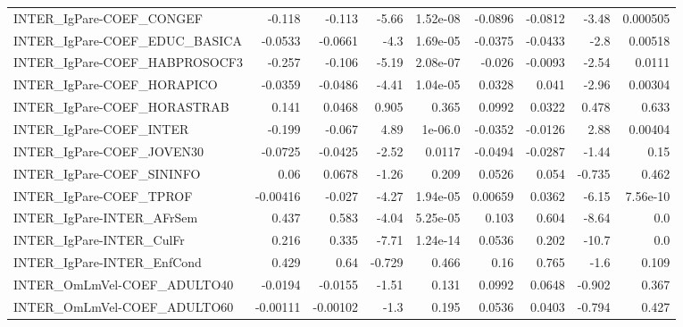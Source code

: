 \begin{tabular}{lrrrrrrrr}
INTER\_IgPare-COEF\_CONGEF              &      -0.118 &       -0.113 &    -5.66 & 1.52e-08 &    -0.0896 &     -0.0812 &        -3.48 &      0.000505 \\
INTER\_IgPare-COEF\_EDUC\_BASICA         &     -0.0533 &      -0.0661 &     -4.3 & 1.69e-05 &    -0.0375 &     -0.0433 &         -2.8 &       0.00518 \\
INTER\_IgPare-COEF\_HABPROSOCF3         &      -0.257 &       -0.106 &    -5.19 & 2.08e-07 &     -0.026 &     -0.0093 &        -2.54 &        0.0111 \\
INTER\_IgPare-COEF\_HORAPICO            &     -0.0359 &      -0.0486 &    -4.41 & 1.04e-05 &     0.0328 &       0.041 &        -2.96 &       0.00304 \\
INTER\_IgPare-COEF\_HORASTRAB           &       0.141 &       0.0468 &    0.905 &    0.365 &     0.0992 &      0.0322 &        0.478 &         0.633 \\
INTER\_IgPare-COEF\_INTER               &      -0.199 &       -0.067 &     4.89 &  1e-06.0 &    -0.0352 &     -0.0126 &         2.88 &       0.00404 \\
INTER\_IgPare-COEF\_JOVEN30             &     -0.0725 &      -0.0425 &    -2.52 &   0.0117 &    -0.0494 &     -0.0287 &        -1.44 &          0.15 \\
INTER\_IgPare-COEF\_SININFO             &        0.06 &       0.0678 &    -1.26 &    0.209 &     0.0526 &       0.054 &       -0.735 &         0.462 \\
INTER\_IgPare-COEF\_TPROF               &    -0.00416 &       -0.027 &    -4.27 & 1.94e-05 &    0.00659 &      0.0362 &        -6.15 &      7.56e-10 \\
INTER\_IgPare-INTER\_AFrSem             &       0.437 &        0.583 &    -4.04 & 5.25e-05 &      0.103 &       0.604 &        -8.64 &           0.0 \\
INTER\_IgPare-INTER\_CulFr              &       0.216 &        0.335 &    -7.71 & 1.24e-14 &     0.0536 &       0.202 &        -10.7 &           0.0 \\
INTER\_IgPare-INTER\_EnfCond            &       0.429 &         0.64 &   -0.729 &    0.466 &       0.16 &       0.765 &         -1.6 &         0.109 \\
INTER\_OmLmVel-COEF\_ADULTO40           &     -0.0194 &      -0.0155 &    -1.51 &    0.131 &     0.0992 &      0.0648 &       -0.902 &         0.367 \\
INTER\_OmLmVel-COEF\_ADULTO60           &    -0.00111 &     -0.00102 &     -1.3 &    0.195 &     0.0536 &      0.0403 &       -0.794 &         0.427 \\

\end{tabular}
